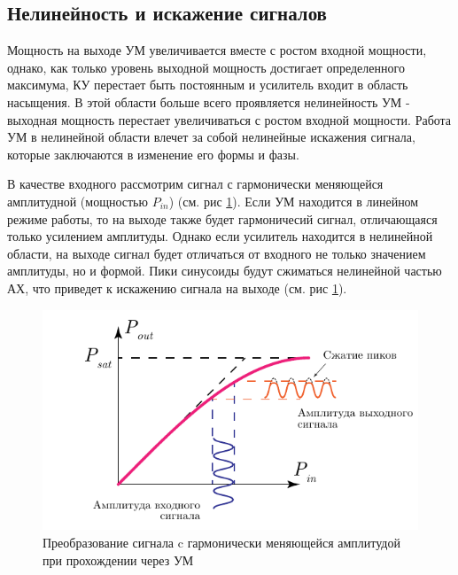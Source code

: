 \subsection{Нелинейность и искажение сигналов}
Мощность на выходе УМ увеличивается вместе с ростом входной мощности,
однако, как только уровень выходной мощность достигает определенного
максимума, КУ перестает быть постоянным и усилитель входит в область
насыщения. В этой области больше всего проявляется нелинейность УМ -
выходная мощность перестает увеличиваться с ростом входной мощности. Работа
УМ в нелинейной области влечет за собой нелинейные искажения сигнала,
которые заключаются в изменение его формы и фазы.

В качестве входного рассмотрим сигнал с гармонически меняющейся амплитудной
(мощностью $P_{in}$) (см. рис \ref{fig:pa_distortion_sin}). Если УМ
находится в линейном режиме работы, то на выходе также будет гармоничесий
сигнал, отличающаяся только усилением амплитуды. Однако если усилитель
находится в нелинейной области, на выходе сигнал будет отличаться от
входного не только значением амплитуды, но и формой. Пики синусоиды будут
сжиматься нелинейной частью АХ, что приведет к искажению сигнала на выходе
(см. рис \ref{fig:pa_distortion_sin}).

\begin{figure}[h!]
    \centering
    \includegraphics[scale=1.2]{figs/amp_dist.pdf}
    \caption{Преобразование сигнала c гармонически меняющейся амплитудой при прохождении через УМ}
    \label{fig:pa_distortion_sin}
\end{figure}



